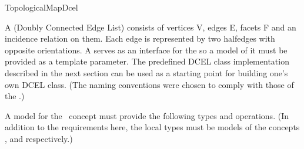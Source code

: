 
\ccRefPageBegin


\begin{ccRefConcept}{TopologicalMapDcel}

A  (Doubly Connected Edge List) consists of vertices V, edges E, facets F and an incidence relation on them. Each edge is
represented by two halfedges with opposite orientations. 
A  serves as an interface for the  so a model of it must be provided as a template parameter.
The predefined DCEL class
implementation described in the next section can be used 
as a starting point for
building one's own DCEL class. (The naming conventions were chosen to comply 
with those of the .)

A model for the \ccRefName\ concept must provide the following types and operations. 
(In addition to the requirements here, the local types 
must be models of the concepts 
,
 and
 respectively.)


\ccTypes

	\ccGlue
	\ccGlue
	\ccGlue


	\ccGlue
	\ccGlue


\end{ccRefConcept}
